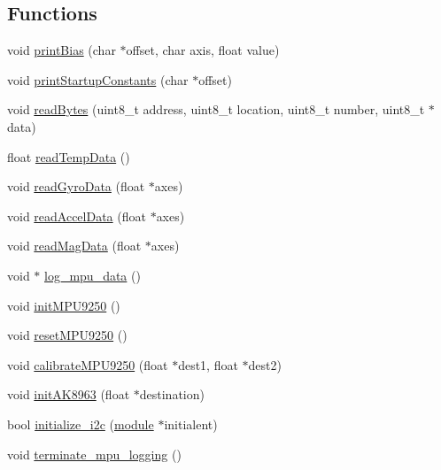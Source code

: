 \subsection*{Functions}
\begin{DoxyCompactItemize}
\item 
void \hyperlink{i2c-interface_8c_a14f7a41ccc0cdae430b5c7086a34e9c0}{print\+Bias} (char $\ast$offset, char axis, float value)
\item 
void \hyperlink{i2c-interface_8c_a7584f35073e31c1833be60c696482e9a}{print\+Startup\+Constants} (char $\ast$offset)
\item 
void \hyperlink{i2c-interface_8c_acc553fa90ebff27c5f1d36e44160c181}{read\+Bytes} (uint8\+\_\+t address, uint8\+\_\+t location, uint8\+\_\+t number, uint8\+\_\+t $\ast$data)
\item 
float \hyperlink{i2c-interface_8c_aa12b154e59ddb443b65da8f4458146db}{read\+Temp\+Data} ()
\item 
void \hyperlink{i2c-interface_8c_abeec5582b16c259bda23acaebc77cc3b}{read\+Gyro\+Data} (float $\ast$axes)
\item 
void \hyperlink{i2c-interface_8c_a10fba4cab7c9dfec51afa190dba4c1e9}{read\+Accel\+Data} (float $\ast$axes)
\item 
void \hyperlink{i2c-interface_8c_a121c45c907088a8dcb84c0d72ded4f2b}{read\+Mag\+Data} (float $\ast$axes)
\item 
void $\ast$ \hyperlink{i2c-interface_8c_a0ffd56a84248b3976097e0d38b2fcdaf}{log\+\_\+mpu\+\_\+data} ()
\item 
void \hyperlink{i2c-interface_8c_a24e95677ec9c52347c6e2bda7708c319}{init\+M\+P\+U9250} ()
\item 
void \hyperlink{i2c-interface_8c_a34e6720f7e9da9aa7bdd3d3afec24f77}{reset\+M\+P\+U9250} ()
\item 
void \hyperlink{i2c-interface_8c_a52b2e791d39612643014e3900f1bc7d2}{calibrate\+M\+P\+U9250} (float $\ast$dest1, float $\ast$dest2)
\item 
void \hyperlink{i2c-interface_8c_a70fbb9dd53a39541d7f04140a2c63f3f}{init\+A\+K8963} (float $\ast$destination)
\item 
bool \hyperlink{i2c-interface_8c_a8eb11c031b9484a01fd8b263c13373cf}{initialize\+\_\+i2c} (\hyperlink{structmodule}{module} $\ast$initialent)
\item 
void \hyperlink{i2c-interface_8c_a3644aefb56a2169f316b0f2510ffc56c}{terminate\+\_\+mpu\+\_\+logging} ()
\end{DoxyCompactItemize}

